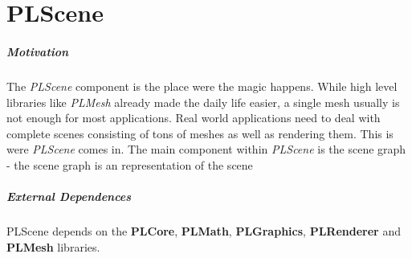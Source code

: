 \chapter{PLScene}


\paragraph{Motivation}
The \emph{PLScene} component is the place were the magic happens. While high level libraries like \emph{PLMesh} already made the daily life easier, a single mesh usually is not enough for most applications. Real world applications need to deal with complete scenes consisting of tons of meshes as well as rendering them. This is were \emph{PLScene} comes in. The main component within \emph{PLScene} is the scene graph - the scene graph is an representation of the scene


\paragraph{External Dependences}
PLScene depends on the \textbf{PLCore}, \textbf{PLMath}, \textbf{PLGraphics}, \textbf{PLRenderer} and \textbf{PLMesh} libraries.





\cleardoublepage
